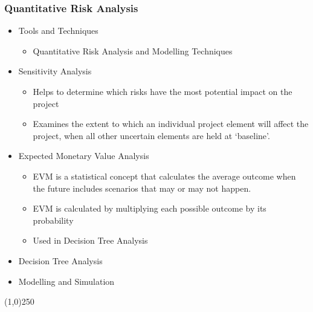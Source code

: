 





\begin{frame}
\frametitle{Quantitative Risk Analysis}
\begin{itemize}
	\item Tools and Techniques
	\begin{itemize}
		\item Quantitative Risk Analysis and Modelling Techniques
	\end{itemize}
	\item Sensitivity Analysis
	\begin{itemize}
		\item Helps to determine which risks have the most potential impact on the project
		\item Examines the extent to which an individual project element will affect the project, when all other uncertain elements are held at `baseline'.
	\end{itemize}
	\item Expected Monetary Value Analysis
	\begin{itemize}
		\item EVM is a statistical concept that calculates the average outcome when the future includes scenarios that may or may not happen.
		\item EVM is calculated by multiplying each possible outcome by its probability
		\item Used in Decision Tree Analysis
	\end{itemize}
	\item Decision Tree Analysis
	\item Modelling and Simulation
\end{itemize}
\end{frame}\begin{center}\line(1,0){250}\end{center}






